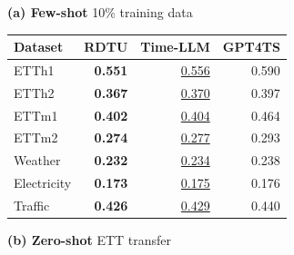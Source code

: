 \documentclass[10pt]{article}
\newcommand{\boldres}[1]{{\textbf{\textcolor{red}{#1}}}}
\newcommand{\secondres}[1]{{\underline{\textcolor{blue}{#1}}}}
\begin{document}
\begin{minipage}{7.1in}

\setlength{\textwidth}{\linewidth}

\captionsetup{type=table}

\centering
\begingroup

\renewcommand{\boldres}[1]{\textcolor{fzBest}{\textbf{#1}}}
\renewcommand{\secondres}[1]{\textcolor{fzSecond}{\underline{#1}}}

\setlength{\tabcolsep}{4pt}
\setlength{\heavyrulewidth}{0.7pt}
\setlength{\lightrulewidth}{0.35pt}
\renewcommand{\arraystretch}{1.12}

\caption{Few-shot and zero-shot forecasting results, averaged over prediction horizons. \boldres{Bold red}: the best; \secondres{Blue}: the second best.}
\label{tab:few-zero-shot-combined}
\label{tab:few-shot-forecasting-10per-brief}
\label{tab:zero-shot-forecasting-brief}

\small
\vspace{-9pt}

\begin{minipage}[t]{0.48\textwidth}
\vspace{0pt}
\noindent\strut\textbf{(a) Few-shot}\hfill
\textcolor{black!65}{10\% training data}\par
\vspace{4pt}

\centering
\begin{tabular*}{\linewidth}{@{\extracolsep{\fill}}lrrr@{}}
\toprule
\textbf{Dataset}
  & \textbf{RDTU}
  & \textbf{Time-LLM}
  & \textbf{GPT4TS} \\
\midrule
ETTh1       & \boldres{0.551} & \secondres{0.556} & 0.590 \\
ETTh2       & \boldres{0.367} & \secondres{0.370} & 0.397 \\
ETTm1       & \boldres{0.402} & \secondres{0.404} & 0.464 \\
ETTm2       & \boldres{0.274} & \secondres{0.277} & 0.293 \\
\addlinespace[2pt]
Weather     & \boldres{0.232} & \secondres{0.234} & 0.238 \\
Electricity & \boldres{0.173} & \secondres{0.175} & 0.176 \\
Traffic     & \boldres{0.426} & \secondres{0.429} & 0.440 \\
\bottomrule
\end{tabular*}
\end{minipage}\hfill
\begin{minipage}[t]{0.48\textwidth}
\vspace{0pt}
\noindent\strut\textbf{(b) Zero-shot}\hfill
\textcolor{black!65}{ETT transfer}\par
\vspace{4pt}


\end{minipage}
\end{minipage}
\end{document}
